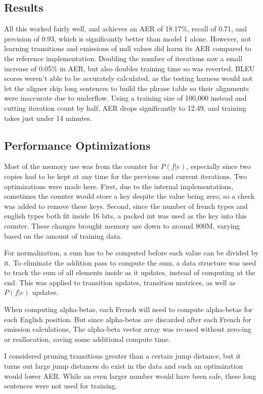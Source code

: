 \documentclass[11pt]{article}
\begin{document}
\subsection{Results}
All this worked fairly well, and achieves an AER of 18.17\%, 
recall of 0.71, and precision of 0.93, which is significantly better than model 1 alone. 
However, not learning transitions and emissions of null values did harm its AER compared
to the reference implementation. Doubling the number of iterations saw a small increase
of 0.05\% in AER, but also doubles training time so was reverted. BLEU scores weren't able
to be accurately calculated, as the testing harness would not let the aligner skip
long sentences to build the phrase table so their alignments were inaccurate due to underflow.
Using a training size of 100,000 instead and cutting iteration count by half, AER
drops significantly to 12.49, and training takes just under 14 minutes.

\subsection{Performance Optimizations}

Most of the memory use was from the counter for $P(f|e)$, especially since two copies had to
be kept at any time for the previous and current iterations. Two optimizations were made here.
First, due to the internal implementations, sometimes the counter would store a key despite
the value being zero, so a check was added to remove these keys. Second, since the number
of french types and english types both fit inside 16 bits, a packed int was used as the key
into this counter. These changes brought memory use down to around 800M, varying based on
the amount of training data.

For normalization, a sum has to be computed before each value can be divided by it.
To eliminate the addition pass to compute the sum, a data structure was used to track the
sum of all elements inside as it updates, instead of computing at the end. This was applied 
to transition updates, transition matrices, as well as $P(f|e)$ updates.

When computing alpha-betas, each French will need to compute alpha-betas for each English
position. But since alpha-betas are discarded after each French for emission calculations, 
The alpha-beta vector array was re-used without zero-ing or reallocation, saving some
additional compute time.

I considered pruning transitions greater than a certain jump distance, but it turns out
large jump distances do exist in the data and such an optimization would lower AER. While
an even larger number would have been safe, these long sentences were not used for training.
\end{document}
